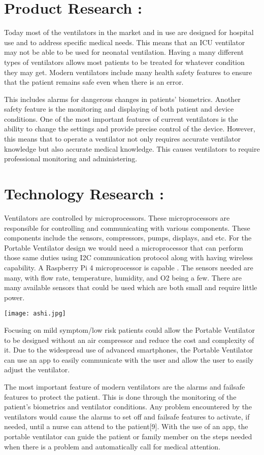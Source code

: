 \documentclass[12pt]{article}
\begin{document}
\clearpage
\section*{Product Research : }
Today most of the ventilators in the market and in use are designed for hospital use and to
address specific medical needs. This means that an ICU ventilator may not be able to be used for
neonatal ventilation. Having a many different types of ventilators allows most patients to be
treated for whatever condition they may get. Modern ventilators include many health safety
features to ensure that the patient remains safe even when there is an error.


 This includes
alarms for dangerous changes in patients’ biometrics. Another safety feature is the monitoring
and displaying of both patient and device conditions. One of the most important features of
current ventilators is the ability to change the settings and provide precise control of the device.
However, this means that to operate a ventilator not only requires accurate ventilator knowledge
but also accurate medical knowledge. This causes ventilators to require professional monitoring
and administering.

\section*{Technology Research : }
Ventilators are controlled by microprocessors. These microprocessors are responsible for
controlling and communicating with various components. These components include the sensors,
compressors, pumps, displays, and etc. For the Portable Ventilator design we would need a
microprocessor that can perform those same duties using I2C communication protocol along
with having wireless capability. A Raspberry Pi 4 microprocessor is capable . The
sensors needed are many, with flow rate, temperature, humidity, and O2 being a few. There are
many available sensors that could be used which are both small and require little power.

\texttt{[image: ashi.jpg]}


Focusing on mild symptom/low risk patients could allow the Portable Ventilator to be
designed without an air compressor and reduce the cost and complexity of it. Due to the
widespread use of advanced smartphones, the Portable Ventilator can use an app to easily
communicate with the user and allow the user to easily adjust the ventilator.


The most important feature of modern ventilators are the alarms and failsafe features to
protect the patient. This is done through the monitoring of the patient’s biometrics and ventilator
conditions. Any problem encountered by the ventilators would cause the alarms to set off and
failsafe features to activate, if needed, until a nurse can attend to the patient[9]. With the use of
an app, the portable ventilator can guide the patient or family member on the steps needed when
there is a problem and automatically call for medical attention.
\end{document}
